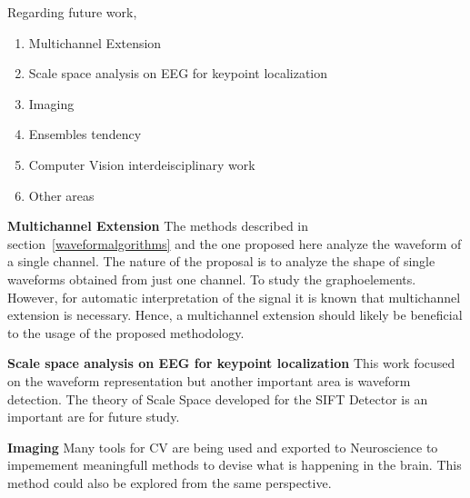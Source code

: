 Regarding future work, 

\begin{enumerate}
\item Multichannel Extension
\item Scale space analysis on EEG for keypoint localization
\item Imaging
\item Ensembles tendency
\item Computer Vision interdeisciplinary work
\item Other areas
\end{enumerate}

\textbf{Multichannel Extension}
The methods described in section~\ref{waveformalgorithms} and the one proposed here analyze the waveform of a single channel.
The nature of the proposal is to analyze the shape of single waveforms obtained from just one channel.  To study the graphoelements.
However, for automatic interpretation of the signal it is known that multichannel extension is necessary.  Hence, a multichannel extension should likely be beneficial to the usage of the proposed methodology.

\textbf{Scale space analysis on EEG for keypoint localization}
This work focused on the waveform representation but another important area is waveform detection.  The theory of Scale Space developed for the SIFT Detector is an important are for future study.


\textbf{Imaging}
Many tools for CV are being used and exported to Neuroscience to impemement meaningfull methods to devise what is happening in the brain.  This method could also be explored from the same perspective.


